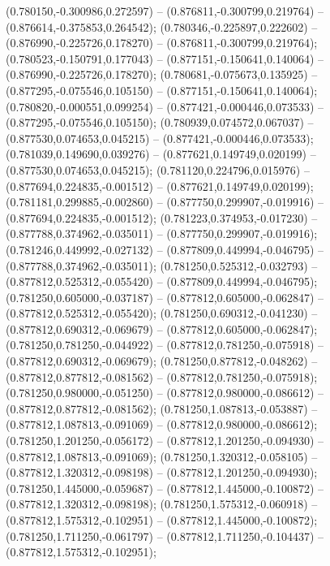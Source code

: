  (0.780150,-0.300986,0.272597) -- (0.876811,-0.300799,0.219764) -- (0.876614,-0.375853,0.264542);
 (0.780346,-0.225897,0.222602) -- (0.876990,-0.225726,0.178270) -- (0.876811,-0.300799,0.219764);
 (0.780523,-0.150791,0.177043) -- (0.877151,-0.150641,0.140064) -- (0.876990,-0.225726,0.178270);
 (0.780681,-0.075673,0.135925) -- (0.877295,-0.075546,0.105150) -- (0.877151,-0.150641,0.140064);
 (0.780820,-0.000551,0.099254) -- (0.877421,-0.000446,0.073533) -- (0.877295,-0.075546,0.105150);
 (0.780939,0.074572,0.067037) -- (0.877530,0.074653,0.045215) -- (0.877421,-0.000446,0.073533);
 (0.781039,0.149690,0.039276) -- (0.877621,0.149749,0.020199) -- (0.877530,0.074653,0.045215);
 (0.781120,0.224796,0.015976) -- (0.877694,0.224835,-0.001512) -- (0.877621,0.149749,0.020199);
 (0.781181,0.299885,-0.002860) -- (0.877750,0.299907,-0.019916) -- (0.877694,0.224835,-0.001512);
 (0.781223,0.374953,-0.017230) -- (0.877788,0.374962,-0.035011) -- (0.877750,0.299907,-0.019916);
 (0.781246,0.449992,-0.027132) -- (0.877809,0.449994,-0.046795) -- (0.877788,0.374962,-0.035011);
 (0.781250,0.525312,-0.032793) -- (0.877812,0.525312,-0.055420) -- (0.877809,0.449994,-0.046795);
 (0.781250,0.605000,-0.037187) -- (0.877812,0.605000,-0.062847) -- (0.877812,0.525312,-0.055420);
 (0.781250,0.690312,-0.041230) -- (0.877812,0.690312,-0.069679) -- (0.877812,0.605000,-0.062847);
 (0.781250,0.781250,-0.044922) -- (0.877812,0.781250,-0.075918) -- (0.877812,0.690312,-0.069679);
 (0.781250,0.877812,-0.048262) -- (0.877812,0.877812,-0.081562) -- (0.877812,0.781250,-0.075918);
 (0.781250,0.980000,-0.051250) -- (0.877812,0.980000,-0.086612) -- (0.877812,0.877812,-0.081562);
 (0.781250,1.087813,-0.053887) -- (0.877812,1.087813,-0.091069) -- (0.877812,0.980000,-0.086612);
 (0.781250,1.201250,-0.056172) -- (0.877812,1.201250,-0.094930) -- (0.877812,1.087813,-0.091069);
 (0.781250,1.320312,-0.058105) -- (0.877812,1.320312,-0.098198) -- (0.877812,1.201250,-0.094930);
 (0.781250,1.445000,-0.059687) -- (0.877812,1.445000,-0.100872) -- (0.877812,1.320312,-0.098198);
 (0.781250,1.575312,-0.060918) -- (0.877812,1.575312,-0.102951) -- (0.877812,1.445000,-0.100872);
 (0.781250,1.711250,-0.061797) -- (0.877812,1.711250,-0.104437) -- (0.877812,1.575312,-0.102951);

